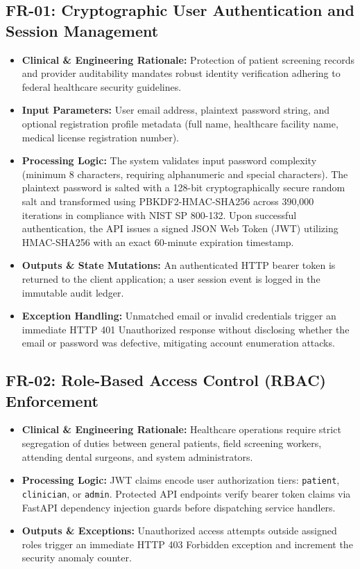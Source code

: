 \documentclass[12pt,a4paper,oneside]{report}
\begin{document}
\subsection{FR-01: Cryptographic User Authentication and Session Management}
\begin{itemize}
    \item \textbf{Clinical \& Engineering Rationale:} Protection of patient screening records and provider auditability mandates robust identity verification adhering to federal healthcare security guidelines.
    \item \textbf{Input Parameters:} User email address, plaintext password string, and optional registration profile metadata (full name, healthcare facility name, medical license registration number).
    \item \textbf{Processing Logic:} The system validates input password complexity (minimum 8 characters, requiring alphanumeric and special characters). The plaintext password is salted with a 128-bit cryptographically secure random salt and transformed using PBKDF2-HMAC-SHA256 across 390,000 iterations in compliance with NIST SP 800-132. Upon successful authentication, the API issues a signed JSON Web Token (JWT) utilizing HMAC-SHA256 with an exact 60-minute expiration timestamp.
    \item \textbf{Outputs \& State Mutations:} An authenticated HTTP bearer token is returned to the client application; a user session event is logged in the immutable audit ledger.
    \item \textbf{Exception Handling:} Unmatched email or invalid credentials trigger an immediate HTTP 401 Unauthorized response without disclosing whether the email or password was defective, mitigating account enumeration attacks.
\end{itemize}

\subsection{FR-02: Role-Based Access Control (RBAC) Enforcement}
\begin{itemize}
    \item \textbf{Clinical \& Engineering Rationale:} Healthcare operations require strict segregation of duties between general patients, field screening workers, attending dental surgeons, and system administrators.
    \item \textbf{Processing Logic:} JWT claims encode user authorization tiers: \texttt{patient}, \texttt{clinician}, or \texttt{admin}. Protected API endpoints verify bearer token claims via FastAPI dependency injection guards before dispatching service handlers.
    \item \textbf{Outputs \& Exceptions:} Unauthorized access attempts outside assigned roles trigger an immediate HTTP 403 Forbidden exception and increment the security anomaly counter.
\end{itemize}
\end{document}

